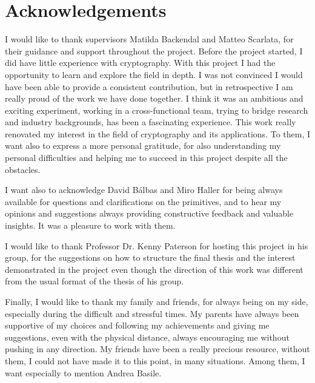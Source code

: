 \chapter*{Acknowledgements}

I would like to thank supervisors Matilda Backendal and Matteo Scarlata,
for their guidance and support throughout the project.
Before the project started, I did have little experience with
cryptography. With this project I had the opportunity to
learn and explore the field in depth. 
I was not convinced I would have been able to provide
a consistent contribution, but in retrospective I am really
proud of the work we have done together.
I think it was an ambitious and exciting experiment,
working in a cross-functional team, trying to bridge
research and industry backgrounds, 
has been a fascinating experience.
This work really renovated my interest in the field of cryptography
and its applications.
To them, I want also to express a more personal gratitude,
for also understanding my personal difficulties and
helping me to succeed in this project despite all the obstacles.

I want also to acknowledge David B{\'a}lbas and Miro Haller for 
being always available for questions and clarifications on the primitives,
and to hear my opinions and suggestions always providing
constructive feedback and valuable insights. It was a pleasure
to work with them.

I would like to thank Professor Dr. Kenny Paterson
for hosting this project in his group, for the suggestions
on how to structure the final thesis and the interest
demonstrated in the project even though the direction
of this work was different from the usual format of the thesis
of his group.

Finally, I would like to thank my family and friends, for always
being on my side, especially during the difficult and stressful
times. My parents have always been supportive of my choices and
following my achievements and giving me suggestions, 
even with the physical distance, 
always encouraging me without pushing in any direction. 
My friends have been
a really precious resource, without them, I could not have
made it to this point, in many situations. Among them, I want
especially to mention Andrea Basile.
